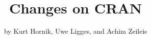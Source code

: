 \title{Changes on CRAN}
\author{by Kurt Hornik, Uwe Ligges, and Achim Zeileis}

\maketitle





\address{%
Kurt Hornik\\
\\%
\\
%
%
%
%
}

\address{%
Uwe Ligges\\
\\%
\\
%
%
%
%
}

\address{%
Achim Zeileis\\
\\%
\\
%
%
%
%
}
